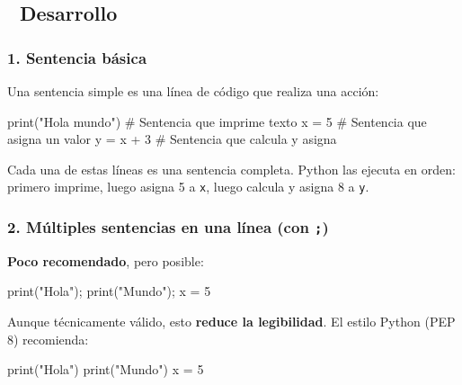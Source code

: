 \documentclass[
  doc,
  floatsintext,
  longtable,
  a4paper,
  nolmodern,
  notxfonts,
  notimes,
  12pt,
  colorlinks=true,linkcolor=blue,citecolor=blue,urlcolor=blue]{apa7}
\newenvironment{Shaded}{\begin{snugshade}}{\end{snugshade}}
\newcommand{\BuiltInTok}[1]{\textcolor[rgb]{0.00,0.23,0.31}{#1}}
\newcommand{\CommentTok}[1]{\textcolor[rgb]{0.37,0.37,0.37}{#1}}
\newcommand{\DecValTok}[1]{\textcolor[rgb]{0.68,0.00,0.00}{#1}}
\newcommand{\NormalTok}[1]{\textcolor[rgb]{0.00,0.23,0.31}{#1}}
\newcommand{\OperatorTok}[1]{\textcolor[rgb]{0.37,0.37,0.37}{#1}}
\newcommand{\StringTok}[1]{\textcolor[rgb]{0.13,0.47,0.30}{#1}}
\begin{document}
\subsection{📐 Desarrollo}\label{desarrollo}

\subsubsection{1. Sentencia básica}\label{sentencia-buxe1sica}

Una sentencia simple es una línea de código que realiza una acción:

\begin{Shaded}
\begin{Highlighting}[]
\BuiltInTok{print}\NormalTok{(}\StringTok{"Hola mundo"}\NormalTok{)  }\CommentTok{\# Sentencia que imprime texto}
\NormalTok{x }\OperatorTok{=} \DecValTok{5}                \CommentTok{\# Sentencia que asigna un valor}
\NormalTok{y }\OperatorTok{=}\NormalTok{ x }\OperatorTok{+} \DecValTok{3}            \CommentTok{\# Sentencia que calcula y asigna}
\end{Highlighting}
\end{Shaded}

Cada una de estas líneas es una sentencia completa. Python las ejecuta
en orden: primero imprime, luego asigna 5 a \texttt{x}, luego calcula y
asigna 8 a \texttt{y}.

\subsubsection{\texorpdfstring{2. Múltiples sentencias en una línea (con
\texttt{;})}{2. Múltiples sentencias en una línea (con ;)}}\label{muxfaltiples-sentencias-en-una-luxednea-con}

\textbf{Poco recomendado}, pero posible:

\begin{Shaded}
\begin{Highlighting}[]
\BuiltInTok{print}\NormalTok{(}\StringTok{"Hola"}\NormalTok{)}\OperatorTok{;} \BuiltInTok{print}\NormalTok{(}\StringTok{"Mundo"}\NormalTok{)}\OperatorTok{;}\NormalTok{ x }\OperatorTok{=} \DecValTok{5}
\end{Highlighting}
\end{Shaded}

Aunque técnicamente válido, esto \textbf{reduce la legibilidad}. El
estilo Python (PEP 8) recomienda:

\begin{Shaded}
\begin{Highlighting}[]
\BuiltInTok{print}\NormalTok{(}\StringTok{"Hola"}\NormalTok{)}
\BuiltInTok{print}\NormalTok{(}\StringTok{"Mundo"}\NormalTok{)}
\NormalTok{x }\OperatorTok{=} \DecValTok{5}
\end{Highlighting}
\end{Shaded}
\end{document}
